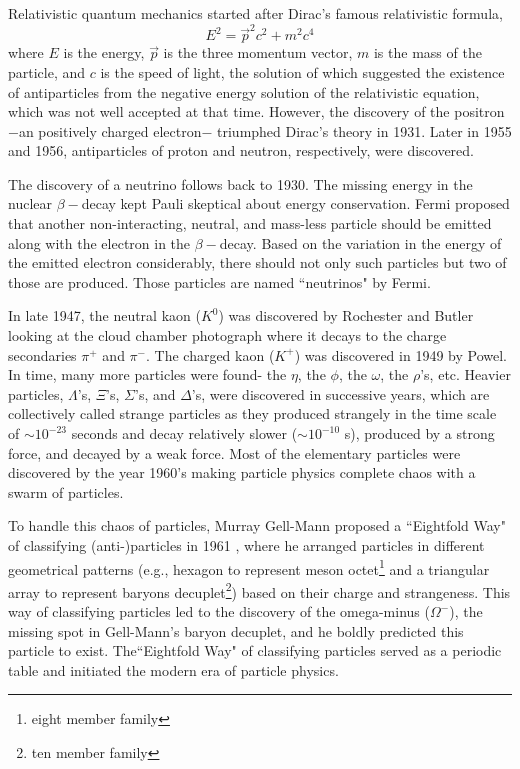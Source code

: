  Relativistic quantum mechanics started after Dirac's famous relativistic formula,
 \begin{equation}
     E^2 = \vec{p}^2c^2 + m^2 c^4
 \end{equation}
where $E$ is the energy, $\vec{p}$ is the three momentum vector, $m$ is the mass of the particle, and $c$ is the speed of light, the solution of which suggested the existence of antiparticles from the negative energy solution of the relativistic equation, which was not well accepted at that time. However,  the discovery of the positron$-$an positively charged electron$-$ triumphed Dirac's theory in 1931.  Later in 1955 and 1956, antiparticles of proton and neutron, respectively, were discovered.

The discovery of a neutrino follows back to 1930. The missing energy in the nuclear $\beta -$decay kept Pauli skeptical about energy conservation. Fermi proposed that another non-interacting, neutral, and mass-less particle should be emitted along with the electron in the $\beta-$decay. Based on the variation in the energy of the emitted electron considerably, there should not only such particles but two of those are produced. Those particles are named ``neutrinos" by Fermi. 

In late 1947, the neutral kaon ($K^0$) was discovered by Rochester and Butler \cite{Rochester:1947mi} looking at the cloud chamber photograph where it decays to the charge secondaries $\pi^+$ and $\pi^-$. The charged kaon ($K^+$) was discovered in 1949 by Powel. In time, many more particles were found- the $\eta$, the $\phi$, the $\omega$, the $\rho$'s, etc. Heavier particles, $\Lambda$'s, $\Xi$'s, $\Sigma$'s, and $\Delta$'s, were discovered in successive years, which are collectively called strange particles as they produced strangely in the time scale of $\sim 10^{-23}$ seconds and decay relatively slower ($\sim 10^{-10}$ s),  produced by a strong force, and decayed by a weak force. Most of the elementary particles were discovered by the year 1960's making particle physics complete chaos with a swarm of particles. 

To handle this chaos of particles, Murray Gell-Mann proposed a 
``Eightfold Way" of classifying (anti-)particles in 1961 \cite{GellMann:1962}, where he arranged particles in different geometrical patterns (e.g., hexagon to represent meson octet\footnote{eight member family} and a triangular array to represent baryons decuplet\footnote{ten member family}) based on their charge and strangeness. This way of classifying particles led to the discovery of the omega-minus ($\Omega^-$), the missing spot in Gell-Mann's baryon decuplet, and he boldly predicted this particle to exist. The``Eightfold Way" of classifying particles served as a periodic table and initiated the modern era of particle physics.

